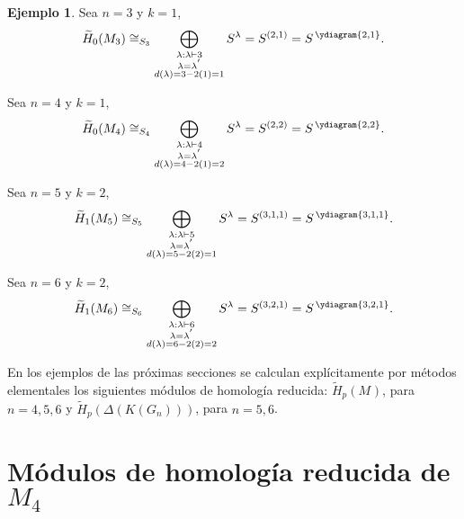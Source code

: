 \documentclass[12pt]{book}
\theoremstyle{definition}
\newtheorem{example}[theorem]{Ejemplo}
\newcounter{in}
\begin{document}
\begin{example}
  \quad

  Sea $n=3$ y $k=1$, 
  \begin{equation*}
    \widetilde H_{0}(M_{3})\cong_{S_{3}}\bigoplus_{\substack{\lambda:\lambda\vdash 3\\
        \lambda=\lambda^{'}\\d(\lambda)=3-2(1)=1}} S^{\lambda}=S^{(2,1)}=S^{\,\ydiagram{2,1}}.
  \end{equation*}
          
  Sea $n=4$ y $k=1$,
  \begin{equation*}
    \widetilde H_{0}(M_{4})\cong_{S_{4}}\bigoplus_{\substack{\lambda:\lambda\vdash 4\\
        \lambda=\lambda^{'}\\d(\lambda)=4-2(1)=2}} S^{\lambda}=S^{(2,2)}=S^{\,\ydiagram{2,2}}.
  \end{equation*}

  Sea $n=5$ y $k=2$,
  \begin{equation*}
    \widetilde H_{1}(M_{5})\cong_{S_{5}}\bigoplus_{\substack{\lambda:\lambda\vdash 5\\
        \lambda=\lambda^{'}\\d(\lambda)=5-2(2)=1}} S^{\lambda}=S^{(3,1,1)}=S^{\,\ydiagram{3,1,1}}.
  \end{equation*}
        
  Sea $n=6$ y $k=2$,
  \begin{equation*}
    \widetilde H_{1}(M_{6})\cong_{S_{6}}\bigoplus_{\substack{\lambda:\lambda\vdash 6\\
        \lambda=\lambda^{'}\\d(\lambda)=6-2(2)=2}} S^{\lambda}=S^{(3,2,1)}=S^{\,\ydiagram{3,2,1}}.
  \end{equation*}
\end{example}

En los ejemplos de las próximas secciones se calculan explícitamente
por métodos elementales los siguientes módulos de homología reducida: $\widetilde
H_{p}(M_{})$, para $n=4,5,6$ y $\widetilde H_{p}(\Delta(K(G_{n})))$, para $n=5,6$.

\section{Módulos de homología reducida de $M_{4}$}
\label{hom-red-M4}
\end{document}
